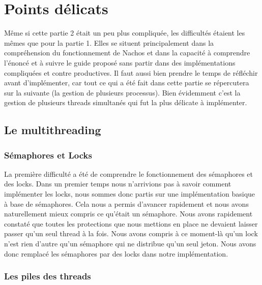 \documentclass[11pt]{article}
\begin{document}
\newpage
\section {Points délicats}

Même si cette partie 2 était un peu plus compliquée, les difficultés étaient les mêmes
que pour la partie 1. Elles se situent principalement dans la compréhension du fonctionnement
de Nachos et dans la capacité à comprendre l'énoncé et à suivre le guide proposé sans
partir dans des implémentations compliquées et contre productives. Il faut aussi
bien prendre le temps de réfléchir avant d'implémenter, car tout ce qui a été fait dans
cette partie se répercutera sur la suivante (la gestion de plusieurs processus).
\newline
Bien évidemment c'est la gestion de plusieurs threads simultanés qui fut la plus délicate
à implémenter.

\subsection{Le multithreading}
\subsubsection{Sémaphores et Locks}
La première difficulté a été de comprendre le fonctionnement des sémaphores et des locks.
Dans un premier temps nous n'arrivions pas à savoir comment implémenter les locks, nous sommes
donc partis sur une implémentation basique à base de sémaphores. Cela nous a permis d'avancer
rapidement et nous avons naturellement mieux compris ce qu'était un sémaphore.
Nous avons rapidement constaté que toutes les protections que nous mettions en place ne
devaient laisser passer qu'un seul thread à la fois. Nous avons compris à ce moment-là qu'un
lock n'est rien d'autre qu'un sémaphore qui ne distribue qu'un seul jeton.
Nous avons donc remplacé les sémaphores par des locks dans notre implémentation.

\subsubsection{Les piles des threads}
\end{document}
